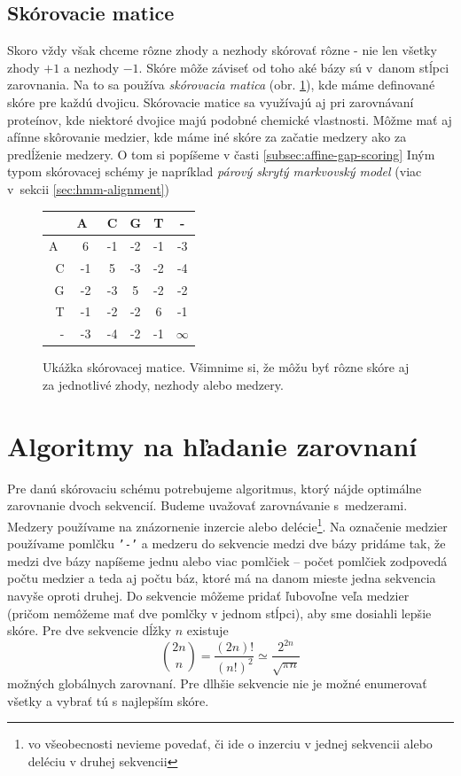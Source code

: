 \subsection{Skórovacie matice}
Skoro vždy však chceme rôzne zhody a nezhody skórovať rôzne - nie len všetky zhody $+1$ a nezhody $-1$.
Skóre môže záviseť od toho aké bázy sú v~danom stĺpci zarovnania. Na to sa používa \textit{skórovacia matica} (obr. \ref{fig:scoringmatrix}), kde máme definované skóre pre každú dvojicu. Skórovacie matice sa využívajú aj pri zarovnávaní proteínov, kde niektoré dvojice majú podobné chemické vlastnosti.
\cite{durbin, skripta}
Môžme mať aj afínne skôrovanie medzier, kde máme iné skóre za začatie medzery ako za predĺženie medzery. O tom si popíšeme v časti \ref{subsec:affine-gap-scoring}
Iným typom skórovacej schémy je napríklad \textit{párový skrytý markvovský model} (viac v~sekcii \ref{sec:hmm-alignment})

\begin{figure}[hbtp]
    \centering
    \begin{tabular}{r|ccccc}
    & A~& C & G & T & -\\
    \hline
    A~& 6 & -1 & -2 & -1 & -3\\
    C & -1 & 5 & -3 & -2 & -4\\
    G & -2 & -3 & 5 & -2 & -2\\
    T & -1 & -2 & -2 & 6 & -1\\
    - & -3 & -4 & -2 & -1 & $\infty$\\
    \end{tabular}
    \caption[Skórovacia matica]{Ukážka skórovacej matice. Všimnime si, že môžu byť rôzne skóre aj za jednotlivé zhody, nezhody alebo medzery.}
    \label{fig:scoringmatrix}
\end{figure}

\section[Algoritmy]{Algoritmy na hľadanie zarovnaní}
Pre danú skórovaciu schému potrebujeme algoritmus, ktorý nájde optimálne zarovnanie dvoch sekvencií.
Budeme uvažovať zarovnávanie s~medzerami. Medzery používame na znázornenie inzercie alebo delécie\footnote{vo všeobecnosti nevieme povedať, či ide o inzerciu v jednej sekvencii alebo deléciu v druhej sekvencii}. Na označenie medzier používame pomlčku {\tt'-'} a medzeru do sekvencie medzi dve bázy pridáme tak, že medzi dve bázy napíšeme jednu alebo viac pomlčiek -- počet pomlčiek zodpovedá počtu medzier a teda aj počtu báz, ktoré má na danom mieste jedna sekvencia navyše oproti druhej. Do sekvencie môžeme pridať ľubovoľne veľa medzier (pričom nemôžeme mať dve pomlčky v jednom stĺpci), aby sme dosiahli lepšie skóre. Pre dve sekvencie dĺžky $n$ existuje
$$ {2n \choose n}  = \frac{(2n)!}{(n!)^2} \simeq \frac{2^{2n}}{\sqrt{\pi n}} $$
možných globálnych zarovnaní. \cite{durbin} Pre dlhšie sekvencie nie je možné enumerovať všetky a vybrať tú s najlepším skóre.

